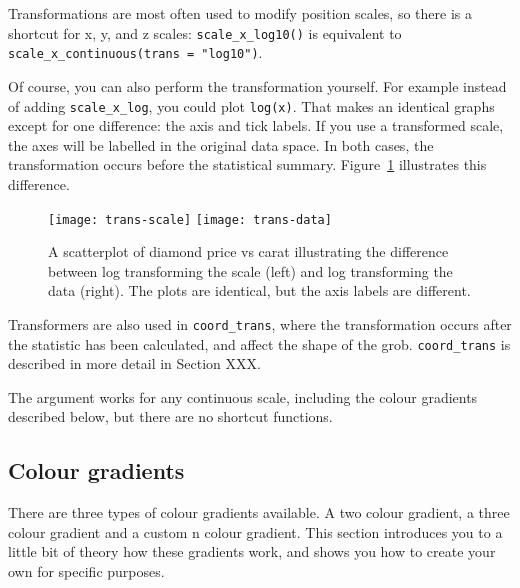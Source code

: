 Transformations are most often used to modify position scales, so there is a shortcut for x, y, and z scales: \verb|scale_x_log10()| is equivalent to \verb|scale_x_continuous(trans = "log10")|.

Of course, you can also perform the transformation yourself.  For example instead of adding {\tt scale\_x\_log}, you could plot {\tt log(x)}.  That makes an identical graphs except for one difference: the axis and tick labels.  If you use a transformed scale, the axes will be labelled in the original data space. In both cases, the transformation occurs before the statistical summary. Figure~\ref{fig:trans} illustrates this difference.

\begin{figure}[htbp]
  \centering
    \texttt{[image: trans-scale]}%
    \texttt{[image: trans-data]}
  \caption{A scatterplot of diamond price vs carat illustrating the difference between log transforming the scale (left) and log transforming the data (right).  The plots are identical, but the axis labels are different.}
  \label{fig:trans}
\end{figure}

Transformers are also used in \verb|coord_trans|, where the transformation occurs after the statistic has been calculated, and affect the shape of the grob.  \verb|coord_trans| is described in more detail in Section XXX.

The  argument works for any continuous scale, including the colour gradients described below, but there are no shortcut functions.

\subsection{Colour gradients}
\label{sub:scale-gradient}

There are three types of colour gradients available.  A two colour gradient, a three colour gradient and a custom n colour gradient.  This section introduces you to a little bit of theory how these gradients work, and shows you how to create your own for specific purposes.



